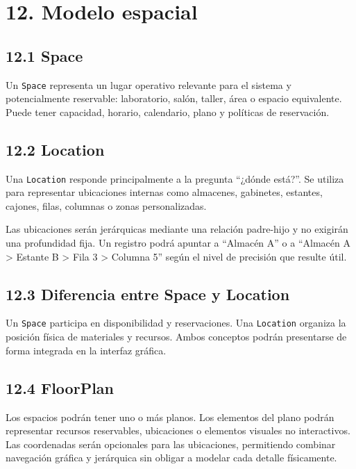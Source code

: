 \documentclass[12pt]{article}
\begin{document}
\section*{12. Modelo espacial}

\subsection*{12.1 Space}

Un \texttt{Space} representa un lugar operativo relevante para el sistema y potencialmente reservable: laboratorio, salón, taller, área o espacio equivalente. Puede tener capacidad, horario, calendario, plano y políticas de reservación.

\subsection*{12.2 Location}

Una \texttt{Location} responde principalmente a la pregunta ``¿dónde está?''. Se utiliza para representar ubicaciones internas como almacenes, gabinetes, estantes, cajones, filas, columnas o zonas personalizadas.

Las ubicaciones serán jerárquicas mediante una relación padre-hijo y no exigirán una profundidad fija. Un registro podrá apuntar a ``Almacén A'' o a ``Almacén A > Estante B > Fila 3 > Columna 5'' según el nivel de precisión que resulte útil.

\subsection*{12.3 Diferencia entre Space y Location}

Un \texttt{Space} participa en disponibilidad y reservaciones. Una \texttt{Location} organiza la posición física de materiales y recursos. Ambos conceptos podrán presentarse de forma integrada en la interfaz gráfica.

\subsection*{12.4 FloorPlan}

Los espacios podrán tener uno o más planos. Los elementos del plano podrán representar recursos reservables, ubicaciones o elementos visuales no interactivos. Las coordenadas serán opcionales para las ubicaciones, permitiendo combinar navegación gráfica y jerárquica sin obligar a modelar cada detalle físicamente.
\end{document}
